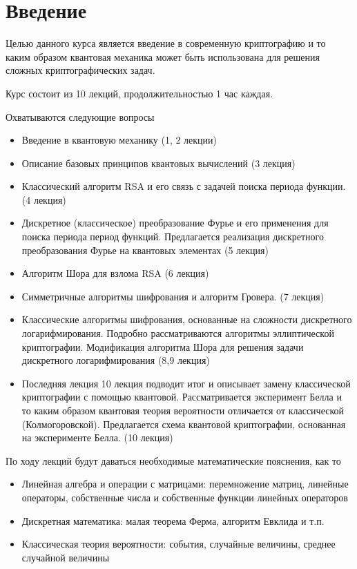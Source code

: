 \chapter*{Введение}
Целью данного курса является введение в современную криптографию и то
каким образом квантовая механика может быть использована для решения
сложных криптографических задач.

Курс состоит из 10 лекций, продолжительностью 1 час каждая.

Охватываются следующие вопросы
\begin{itemize}
\item Введение в квантовую механику (1, 2 лекции)
\item Описание базовых принципов квантовых вычислений (3 лекция)
\item Классический алгоритм RSA и его связь с задачей поиска периода
  функции. (4 лекция) 
\item Дискретное (классическое) преобразование Фурье и
его применения для поиска периода период функций. Предлагается
реализация дискретного преобразования Фурье на квантовых элементах 
(5 лекция)
\item Алгоритм Шора для взлома RSA (6 лекция)
\item Симметричные алгоритмы шифрования и алгоритм
Гровера. (7 лекция)
\item Классические алгоритмы шифрования, основанные на
сложности дискретного логарифмирования. Подробно рассматриваются
алгоритмы эллиптической криптографии. Модификация алгоритма Шора для
решения задачи дискретного логарифмирования (8,9 лекция)
\item Последняя лекция 10 лекция подводит итог и описывает замену
  классической криптографии с  помощью квантовой. Рассматривается
  эксперимент Белла и то каким образом квантовая теория вероятности
  отличается от классической (Колмогоровской). Предлагается схема
  квантовой криптографии, основанная на эксперименте Белла. 
  (10 лекция)
\end{itemize}

По ходу лекций будут даваться необходимые математические пояснения, как
то
\begin{itemize}
\item Линейная алгебра и операции с матрицами: перемножение матриц,
  линейные операторы, собственные числа и собственные функции линейных
  операторов
\item Дискретная математика: малая теорема Ферма, алгоритм
  Евклида и т.п.
\item Классическая теория вероятности: события, случайные величины,
среднее случайной величины
\end{itemize}



